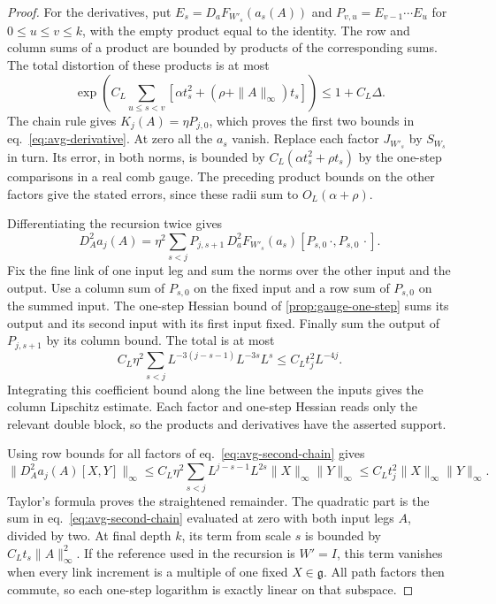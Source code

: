 \documentclass[11pt,letterpaper,reqno]{amsart}
\numberwithin{equation}{section}
\renewcommand{\eqref}[1]{\textup{eq.~\ref{#1}}}
\theoremstyle{definition}
\theoremstyle{remark}
\begin{document}
\begin{proof}
For the derivatives, put \(E_s=D_aF_{W'_s}(a_s(A))\) and
\(P_{v,u}=E_{v-1}\cdots E_u\) for \(0\leq u\leq v\leq k\),
with the empty product equal to the identity. The row and column
sums of a product are bounded by products of the corresponding
sums. The total distortion of these products is at most
\[
 \exp\!\left(C_L\sum_{u\leq s<v}
   [\alpha t_s^2+(\rho+\|A\|_\infty)t_s]\right)
 \leq 1+C_L\Delta .
\]
The chain rule gives \(K_j(A)=\eta P_{j,0}\), which proves the
first two bounds in \eqref{eq:avg-derivative}. At zero all the
\(a_s\) vanish. Replace each factor \(J_{W'_s}\) by
\(S_{W_s}\) in turn. Its error, in both norms, is bounded by
\(C_L(\alpha t_s^2+\rho t_s)\) by the one-step comparisons
in a real comb gauge. The preceding product bounds on the other
factors give the stated errors, since these radii sum to
\(O_L(\alpha+\rho)\).

Differentiating the recursion twice gives
\begin{equation}
 D_A^2a_j(A)
  =\eta^2\sum_{s<j}P_{j,s+1}\,
     D_a^2F_{W'_s}(a_s)[P_{s,0}\,\cdot,P_{s,0}\,\cdot].
 \label{eq:avg-second-chain}
\end{equation}
Fix the fine link of one input leg and sum the norms over the
other input and the output. Use a column sum of \(P_{s,0}\)
on the fixed input and a row sum of \(P_{s,0}\) on the
summed input. The one-step Hessian bound of
\cref{prop:gauge-one-step} sums its output and its second
input with its first input fixed. Finally sum the output of
\(P_{j,s+1}\) by its column bound. The total is at most
\[
 C_L\eta^2\sum_{s<j}L^{-3(j-s-1)}L^{-3s}L^s
 \leq C_L t_j^2 L^{-4j}.
\]
Integrating this coefficient bound along the line between
the inputs gives the column Lipschitz estimate.
Each factor and one-step Hessian reads only the relevant double
block, so the products and derivatives have the asserted support.

Using row bounds for all factors of \eqref{eq:avg-second-chain}
gives
\[
 \|D_A^2a_j(A)[X,Y]\|_\infty
 \leq C_L\eta^2\sum_{s<j} L^{j-s-1} L^{2s}
                         \|X\|_\infty\|Y\|_\infty
 \leq C_L t_j^2\|X\|_\infty\|Y\|_\infty .
\]
Taylor's formula proves the straightened remainder.
The quadratic part is the sum in \eqref{eq:avg-second-chain}
evaluated at zero with both input legs \(A\), divided by two.
At final depth \(k\), its term from scale \(s\) is bounded by
\(C_L t_s\|A\|_\infty^2\). If the reference used in the recursion
is \(W'=I\), this term vanishes when every link increment is a
multiple of one fixed \(X\in\mathfrak g\). All path factors then
commute, so each one-step logarithm is exactly linear on that subspace.


\end{proof}
\end{document}
